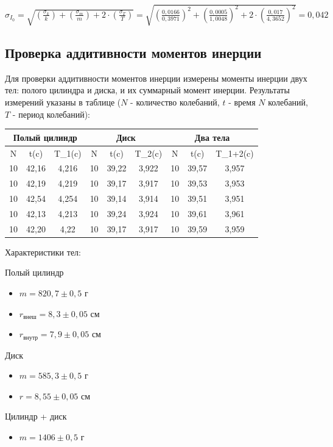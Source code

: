 \documentclass{article}
\begin{document}
\ 

$\sigma_{I_0} = \sqrt{(\frac{\sigma_k}{k}) + (\frac{\sigma_m}{m}) + 2 \cdot (\frac{\sigma_T}{T})}  = \sqrt{(\frac{0,0166}{0,3971})^2 + (\frac{0,0005}{1,0048})^2 + 2 \cdot (\frac{0,017}{4,3652})^2} = 0,042$


\subsection*{Проверка аддитивности моментов инерции}

\noindent
Для проверки аддитивности моментов инерции измерены моменты инерции двух тел: полого цилиндра и диска, и их суммарный момент инерции. Результаты измерений указаны в таблице ($N$ - количество колебаний, $t$ - время $N$ колебаний, $T$ - период колебаний):

\begin{table}[h]
    \centering
    \begin{tabular}{|c|c|c|c|c|c|c|c|c|}
    \hline
        \multicolumn{3}{|c|}{Полый цилиндр} & \multicolumn{3}{|c|}{Диск} & \multicolumn{3}{|c|}{Два тела}\\
    \hline
        N & t(c) & T_1(c) & N & t(c) & T_2(c)  & N & t(c) & T_{1+2}(c) \\
    \hline
        10 & 42,16 & 4,216 & 10 & 39,22 & 3,922 & 10 & 39,57 & 3,957 \\
        10 & 42,19 & 4,219 & 10 & 39,17 & 3,917 & 10 & 39,53 & 3,953 \\
        10 & 42,54 & 4,254 & 10 & 39,14 & 3,914 & 10 & 39,51 & 3,951 \\
        10 & 42,13 & 4,213 & 10 & 39,24 & 3,924 & 10 & 39,61 & 3,961 \\
        10 & 42,20 & 4,22  & 10 & 39,17 & 3,917 & 10 & 39,59 & 3,959 \\
    \hline
    \end{tabular}
\end{table}

\newpage
\noindent
Характеристики тел:

\noindent
Полый цилиндр
\begin{itemize}
    \item $m = 820,7 \pm 0,5$ г
    \item $r_{\text{внеш}} = 8,3 \pm 0,05$ см 
    \item $r_{\text{внутр}} = 7,9 \pm 0,05$ см
\end{itemize}
Диск
\begin{itemize}
    \item $m = 585,3 \pm 0,5$ г
    \item $r = 8,55 \pm 0,05$ см
\end{itemize}
Цилиндр + диск
\begin{itemize}
    \item $m = 1406 \pm 0,5$ г
\end{itemize}
\end{document}

